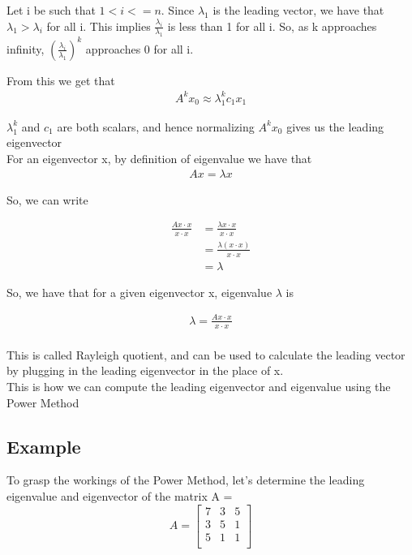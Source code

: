 \documentclass[11pt]{article}
\begin{document}
Let i be such that  $1<i<=n$. Since $\lambda_{1}$ is the leading vector, we have that $\lambda_{1} > \lambda_{i}$ for all i. This implies $\tfrac{\lambda_{i}}{\lambda_{1}}$ is less than 1 for all i. So, as k approaches infinity, $(\tfrac{\lambda_{i}}{\lambda_{1}})^{k}$ approaches 0 for all i. 

From this we get that 
\begin{align*}
     A^{k}x_{0} \approx \lambda_{1}^{k}c_{1}x_{1} \tag{all other terms go to 0}
\end{align*}

$\lambda_{1}^{k}$ and $c_{1}$ are both scalars, and hence normalizing $A^{k}x_{0}$ gives us the leading eigenvector\\

For an eigenvector x, by definition of eigenvalue we have that
\begin{align*}
    Ax = \lambda x \tag{for eigenvalue $\lambda$}
\end{align*}

So, we can write

\begin{align*}
    \frac{Ax\cdot x}{x\cdot x} &= \frac{\lambda x\cdot x}{x\cdot x} \\
    &= \frac{\lambda (x\cdot x)}{x\cdot x}\\
    &= \lambda 
\end{align*}

So, we have that for a given eigenvector x, eigenvalue $\lambda$ is

\begin{align*}
        \lambda = \frac{Ax\cdot x}{x\cdot x} \\
\end{align*}

This is called Rayleigh quotient, and can be used to calculate the leading vector by plugging in the leading eigenvector in the place of x.\\

This is how we can compute the leading eigenvector and eigenvalue using the Power Method

\subsection{Example}
To grasp the workings of the Power Method, let's determine the leading eigenvalue and eigenvector of the matrix A = 
\[ A = 
\begin{bmatrix}
7 & 3 & 5 \\
3 & 5 & 1 \\
5 & 1 & 1 \\
\end{bmatrix}
\]
\end{document}
